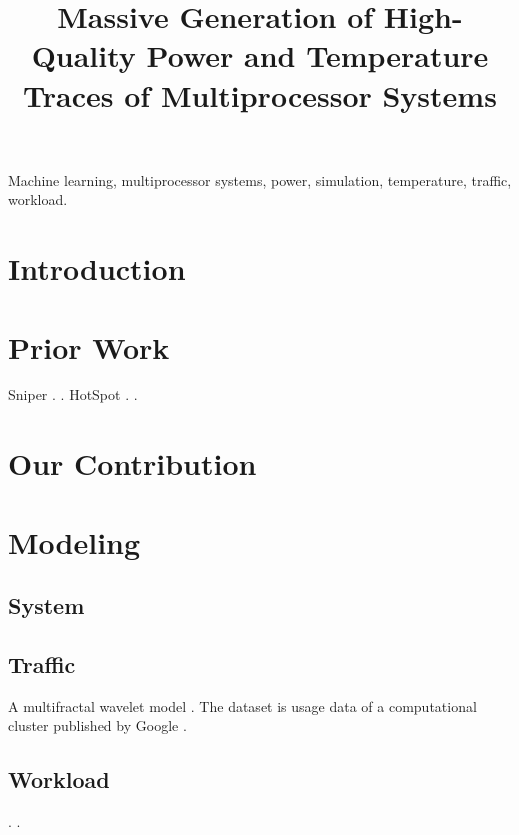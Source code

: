 \documentclass[conference]{IEEEtran}
\title{
  Massive Generation of High-Quality Power and Temperature Traces of
  Multiprocessor Systems
}
\author{}
\begin{document}
  \maketitle

  \begin{abstract}
    
  \end{abstract}

  \begin{IEEEkeywords}
    Machine learning,
    multiprocessor systems,
    power,
    simulation,
    temperature,
    traffic,
    workload.
  \end{IEEEkeywords}


  \section{Introduction} 
  

  \section{Prior Work}
  Sniper \cite{carlson2011}.
   \cite{li2009}.
  HotSpot \cite{skadron2004}.
   \cite{sridhar2010}.

  \section{Our Contribution}

  \section{Modeling}
  \subsection{System}

  \subsection{Traffic}
  A multifractal wavelet model \cite{riedi1999}.
  The dataset is usage data of a computational cluster published by Google
  \cite{google}.

  \subsection{Workload}
   \cite{bienia2011}.
   \cite{cpu2006}.
\end{document}
